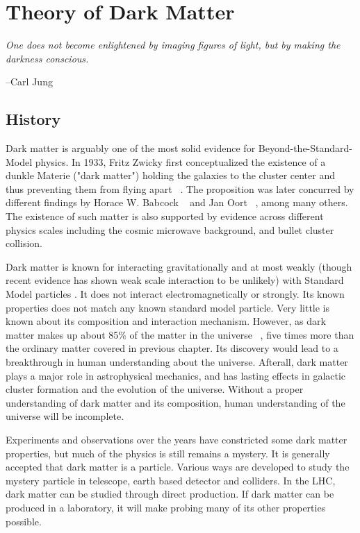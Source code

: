 \chapter{Theory of Dark Matter}


\epigraph{\textit{One does not become enlightened by imaging figures of light, but by making the darkness conscious.}}{--Carl Jung}


	


\section{History}
\label{section:history}
    Dark matter is arguably one of the most solid evidence for Beyond-the-Standard-Model physics. In 1933, Fritz Zwicky first conceptualized the existence of a dunkle Materie ("dark matter") holding the galaxies to the cluster center and thus preventing them from flying apart ~\cite{Zwicky}. The proposition was later concurred by different findings by Horace W. Babcock ~\cite{Babcock} and Jan Oort ~\cite{oort}, among many others. The existence of such matter is also supported by evidence across different physics scales including the cosmic microwave background, and bullet cluster collision.

    Dark matter is known for interacting gravitationally and at most weakly (though recent evidence has shown weak scale interaction to be unlikely) with Standard Model particles . It does not interact electromagnetically or strongly. Its known properties does not match any known standard model particle. Very little is known about its composition and interaction mechanism. However, as dark matter makes up about 85\% of the matter in the universe ~\cite{Hinshaw_2013}, five times more than the ordinary matter covered in previous chapter. Its discovery would lead to a breakthrough in human understanding about the universe. Afterall, dark matter plays a major role in astrophysical mechanics, and has lasting effects in galactic cluster formation and the evolution of the universe. Without a proper understanding of dark matter and its composition, human understanding of the universe will be incomplete.

    Experiments and observations over the years have constricted some dark matter properties, but much of the physics is still remains a mystery. It is generally accepted that dark matter is a particle. Various ways are developed to study the mystery particle in telescope, earth based detector and colliders. In the LHC, dark matter can be studied through direct production. If dark matter can be produced in a laboratory, it will make probing many of its other properties possible. 

